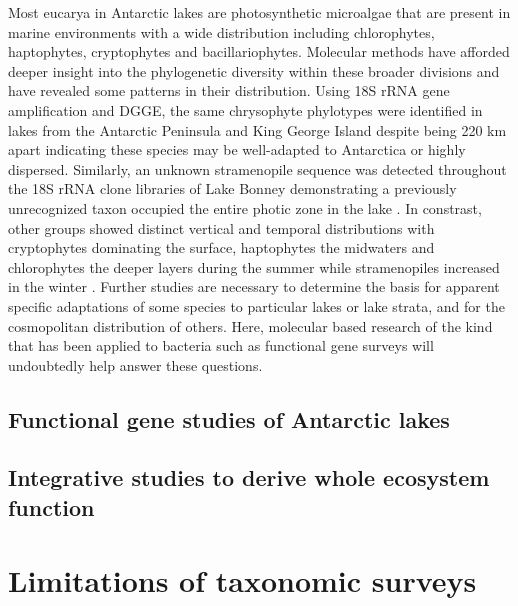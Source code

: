 Most eucarya in Antarctic lakes are photosynthetic microalgae that are present in marine environments with a wide distribution including chlorophytes, haptophytes, cryptophytes and bacillariophytes.
Molecular methods have afforded deeper insight into the phylogenetic diversity within these broader divisions and have revealed some patterns in their distribution. 
Using 18S rRNA gene amplification and DGGE, the same chrysophyte phylotypes were identified in lakes from the Antarctic Peninsula and King George Island 
despite being 220 km apart \cite{Unrein2005} indicating these species may be well-adapted to Antarctica or highly dispersed.
Similarly, an unknown stramenopile sequence was detected throughout the 18S rRNA clone libraries of Lake Bonney 
demonstrating a previously unrecognized taxon occupied the entire photic zone in the lake \cite{Bielewicz2011}. 
In constrast, other groups showed distinct vertical and temporal distributions with cryptophytes dominating the surface, 
haptophytes the midwaters and chlorophytes the deeper layers during the summer while stramenopiles increased in the winter \cite{Bielewicz2011}. 
Further studies are necessary to determine the basis for apparent specific adaptations of some species to particular lakes or lake strata, and for the cosmopolitan distribution of others.
Here, molecular based research of the kind that has been applied to bacteria such as functional gene surveys will undoubtedly help answer these questions.

\subsection{Functional gene studies of Antarctic lakes}

\subsection{Integrative studies to derive whole ecosystem function}


\section{Limitations of taxonomic surveys}
\label{in:pcrlimits}

